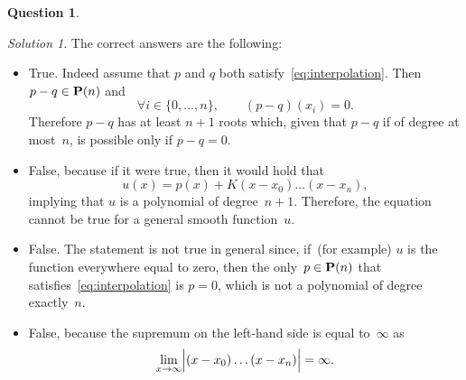 \documentclass[11pt]{article}
\theoremstyle{definition}
\newtheorem{question}{Question}
\theoremstyle{remark}
\newtheorem*{solution}{Solution}
\begin{document}
\begin{question}
\begin{enumerate}
\begin{itemize}
            \end{itemize}
            \begin{solution}
                The correct answers are the following:
                \begin{itemize}
                    \item
                        True. Indeed assume that $p$ and $q$ both satisfy~\eqref{eq:interpolation}.
                        Then $p - q \in \mathbf P(n)$ and
                        \[
                            \forall i \in \{0, \dotsc, n\}, \qquad
                            (p - q) (x_i) = 0.
                        \]
                        Therefore $p - q$ has at least $n+1$ roots which,
                        given that $p - q$ if of degree at most~$n$,
                        is possible only if $p - q = 0$.

                    \item
                        False, because if it were true,
                        then it would hold that
                        \[
                            u(x) = p(x) + K (x - x_0) \dotsc (x - x_n),
                        \]
                        implying that $u$ is a polynomial of degree~$n+1$.
                        Therefore, the equation cannot be true for a general smooth function~$u$.

                    \item
                        False.
                        The statement is not true in general since,
                        if~(for example) $u$ is  the function everywhere equal to zero,
                        then the only~$p \in \mathbf P(n)$ that satisfies~\eqref{eq:interpolation} is $p = 0$,
                        which is not a polynomial of degree exactly~$n$.

                    \item
                        False, because the supremum on the left-hand side is equal to~$\infty$
                        as
                        \[
                            \lim_{x \to \infty} \Bigl\lvert (x - x_0) \dotsc (x - x_n) \Bigr\rvert = \infty.
                        \]


\end{itemize}
\end{solution}
\end{enumerate}
\end{question}
\end{document}
